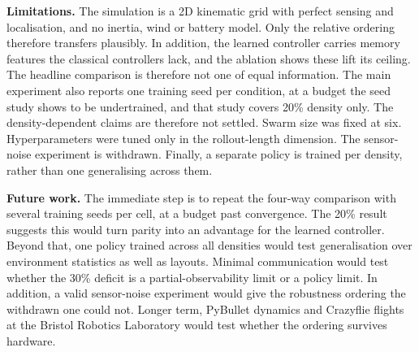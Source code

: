 \documentclass[a4paper, 10pt, conference]{ieeeconf}
\begin{document}
\textbf{Limitations.} The simulation is a 2D kinematic grid with
perfect sensing and localisation, and no inertia, wind or battery
model. Only the relative ordering therefore transfers plausibly. In
addition, the learned controller carries memory features the classical
controllers lack, and the ablation shows these lift its ceiling. The
headline comparison is therefore not one of equal information. The
main experiment also reports one training seed per condition, at a
budget the seed study shows to be undertrained, and that study covers
20\% density only. The density-dependent claims are therefore not
settled. Swarm size was fixed at six. Hyperparameters were tuned only
in the rollout-length dimension. The sensor-noise experiment is
withdrawn. Finally, a separate policy is trained per density, rather
than one generalising across them.

\textbf{Future work.} The immediate step is to repeat the four-way
comparison with several training seeds per cell, at a budget past
convergence. The 20\% result suggests this would turn parity into an
advantage for the learned controller. Beyond that, one policy trained
across all densities would test generalisation over environment
statistics as well as layouts. Minimal communication would test
whether the 30\% deficit is a partial-observability limit or a policy
limit. In addition, a valid sensor-noise experiment would give the
robustness ordering the withdrawn one could not. Longer term, PyBullet
dynamics and Crazyflie flights at the Bristol Robotics Laboratory
would test whether the ordering survives hardware.

{\footnotesize\linespread{0.90}\selectfont


}
\end{document}
